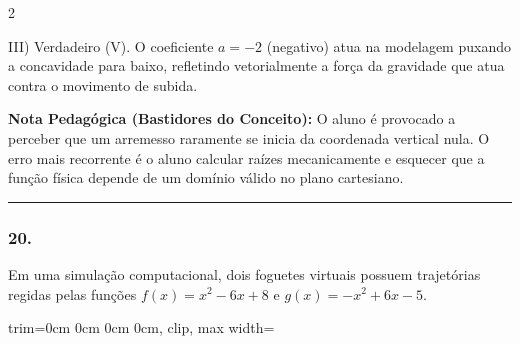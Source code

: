 \begin{multicols*}{2}
\begin{tcolorbox}[colback=CorTitUm!5, colframe=CorTitUm, boxrule=1pt, arc=4pt, left=6pt, right=6pt, top=6pt, bottom=6pt]
    III) Verdadeiro (V). O coeficiente $a=-2$ (negativo) atua na modelagem puxando a concavidade para baixo, refletindo vetorialmente a força da gravidade que atua contra o movimento de subida.
    \end{tcolorbox}
    \vspace{0.15cm}
    
    \begin{boxexplicacao}
    \textbf{Nota Pedagógica (Bastidores do Conceito):} O aluno é provocado a perceber que um arremesso raramente se inicia da coordenada vertical nula. O erro mais recorrente é o aluno calcular raízes mecanicamente e esquecer que a função física depende de um domínio válido no plano cartesiano.
    \end{boxexplicacao}
\fi

\par\vspace{\espacoQuestao}

\noindent\textcolor{CorLinha}{\rule{\linewidth}{0.5pt}} 
\par\vspace{\espacoPreQuestao}
\subsubsection*{20.} 
\begin{enunciadoLiteral}
Em uma simulação computacional, dois foguetes virtuais possuem trajetórias regidas pelas funções $f(x) = x^2 - 6x + 8$ e $g(x) = -x^2 + 6x - 5$.

\begin{center}
\begin{adjustbox}{trim=0cm 0cm 0cm 0cm, clip, max width=\larguraTikz}
\end{adjustbox}
\end{center}


\end{enunciadoLiteral}
\end{multicols*}

